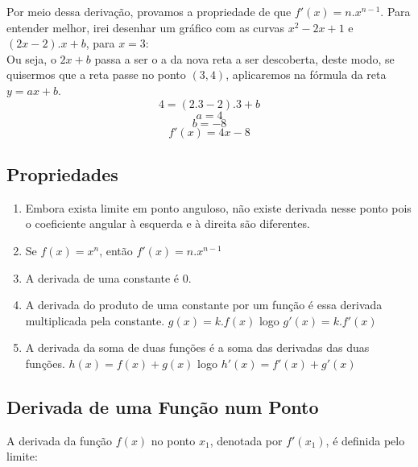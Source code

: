 \documentclass[ ]{article}
\begin{document}
	Por meio dessa derivação, provamos a propriedade de que $f'(x) = n.x^{n-1}$.
	\newpage
	Para entender melhor, irei desenhar um gráfico com as curvas $x^2-2x+1$ e $(2x-2).x+b$, para $x=3$:\\
	Ou seja, o $2x+b$ passa a ser o a da nova reta a ser descoberta, deste modo, se quisermos que a reta passe no ponto $(3,4)$, aplicaremos na fórmula da reta $y = ax+b$.
	$$4 = (2.3-2).3 + b$$
	$$a = 4$$ $$b=-8$$
	$$f'(x) = 4x - 8$$
	
	
	\subsection{Propriedades}
		\begin{enumerate}
			\item Embora exista limite em ponto anguloso, não existe derivada nesse ponto pois o coeficiente angular à esquerda e à direita são diferentes.
			\item Se $f(x) = x^n$, então $f'(x) = n.x^{n-1}$
				
			\item A derivada de uma constante é 0.
			
			\item A derivada do produto de uma constante por um função é essa derivada multiplicada pela constante. $g(x) = k.f(x)$ logo $g'(x) = k.f'(x)$		
			
			\item A derivada da soma de duas funções é a soma das derivadas das duas funções. $h(x) = f(x) + g(x)$ logo $h'(x) = f'(x) + g'(x)$
		\end{enumerate}
	\subsection{Derivada de uma Função num Ponto}
		A derivada da função $f(x)$ no ponto $x_1$, denotada por $f'(x_1)$, é definida pelo limite:
		
\end{document}
